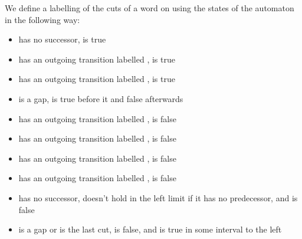 \documentclass[envcountsame]{fsttcs-ps}
\begin{document}
We define a labelling  of the cuts of a word  on  using the
states of the automaton in the following way:
\begin{itemize}
\item  has no successor,  is true
\item  has an outgoing transition labelled ,  is
true
\item  has an outgoing transition labelled ,  is
true
\item  is a gap,  is true before it and false
afterwards
\item  has an outgoing transition labelled ,  is
false
\item  has an outgoing transition labelled ,  is
false
\item  has an outgoing transition labelled ,  is
false
\item  has an outgoing transition labelled , 
is false
\item  has no successor,  doesn't hold in the left limit if it
has no predecessor, and  is false
\item  is a gap or is the last cut,  is false, and
 is true in some interval to the left
\end{itemize}
\end{document}
